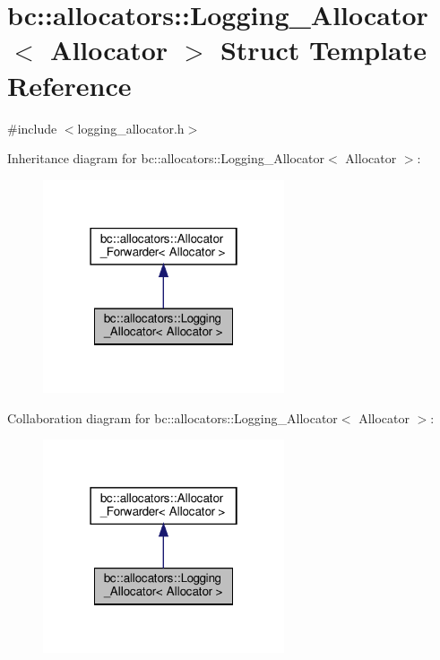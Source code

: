 \hypertarget{structbc_1_1allocators_1_1Logging__Allocator}{}\section{bc\+:\+:allocators\+:\+:Logging\+\_\+\+Allocator$<$ Allocator $>$ Struct Template Reference}
\label{structbc_1_1allocators_1_1Logging__Allocator}


{\ttfamily \#include $<$logging\+\_\+allocator.\+h$>$}



Inheritance diagram for bc\+:\+:allocators\+:\+:Logging\+\_\+\+Allocator$<$ Allocator $>$\+:\nopagebreak
\begin{figure}[H]
\begin{center}
\leavevmode
\includegraphics[width=202pt]{structbc_1_1allocators_1_1Logging__Allocator__inherit__graph}
\end{center}
\end{figure}


Collaboration diagram for bc\+:\+:allocators\+:\+:Logging\+\_\+\+Allocator$<$ Allocator $>$\+:\nopagebreak
\begin{figure}[H]
\begin{center}
\leavevmode
\includegraphics[width=202pt]{structbc_1_1allocators_1_1Logging__Allocator__coll__graph}
\end{center}
\end{figure}
